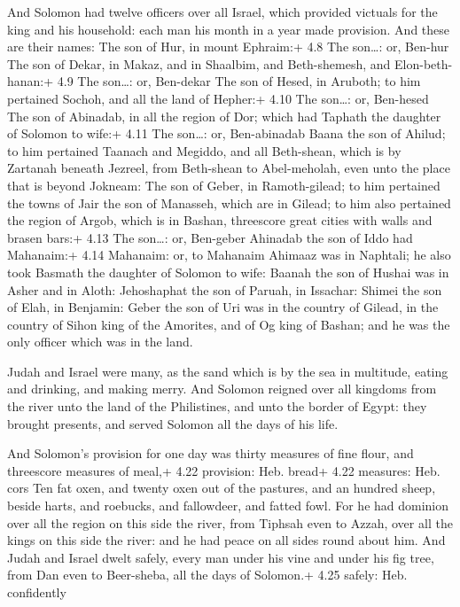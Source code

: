  And Solomon had twelve officers over all Israel, which
provided victuals for the king and his household: each man his month in
a year made provision.  And these are their names: The son
of Hur, in mount Ephraim:+ 4.8 The son\ldots: or, Ben-hur 
The son of Dekar, in Makaz, and in Shaalbim, and Beth-shemesh, and
Elon-beth-hanan:+ 4.9 The son\ldots: or, Ben-dekar  The son
of Hesed, in Aruboth; to him pertained Sochoh, and all the land of
Hepher:+ 4.10 The son\ldots: or, Ben-hesed  The son of
Abinadab, in all the region of Dor; which had Taphath the daughter of
Solomon to wife:+ 4.11 The son\ldots: or, Ben-abinadab 
Baana the son of Ahilud; to him pertained Taanach and Megiddo, and all
Beth-shean, which is by Zartanah beneath Jezreel, from Beth-shean to
Abel-meholah, even unto the place that is beyond Jokneam: 
The son of Geber, in Ramoth-gilead; to him pertained the towns of Jair
the son of Manasseh, which are in Gilead; to him also pertained the
region of Argob, which is in Bashan, threescore great cities with walls
and brasen bars:+ 4.13 The son\ldots: or, Ben-geber 
Ahinadab the son of Iddo had Mahanaim:+ 4.14 Mahanaim: or, to Mahanaim
 Ahimaaz was in Naphtali; he also took Basmath the daughter
of Solomon to wife:  Baanah the son of Hushai was in Asher
and in Aloth:  Jehoshaphat the son of Paruah, in Issachar:
 Shimei the son of Elah, in Benjamin:  Geber
the son of Uri was in the country of Gilead, in the country of Sihon
king of the Amorites, and of Og king of Bashan; and he was the only
officer which was in the land.

 Judah and Israel were many, as the sand which is by the
sea in multitude, eating and drinking, and making merry. 
And Solomon reigned over all kingdoms from the river unto the land of
the Philistines, and unto the border of Egypt: they brought presents,
and served Solomon all the days of his life.

 And Solomon's provision for one day was thirty measures
of fine flour, and threescore measures of meal,+ 4.22 provision: Heb.
bread+ 4.22 measures: Heb. cors  Ten fat oxen, and twenty
oxen out of the pastures, and an hundred sheep, beside harts, and
roebucks, and fallowdeer, and fatted fowl.  For he had
dominion over all the region on this side the river, from Tiphsah even
to Azzah, over all the kings on this side the river: and he had peace on
all sides round about him.  And Judah and Israel dwelt
safely, every man under his vine and under his fig tree, from Dan even
to Beer-sheba, all the days of Solomon.+ 4.25 safely: Heb. confidently

